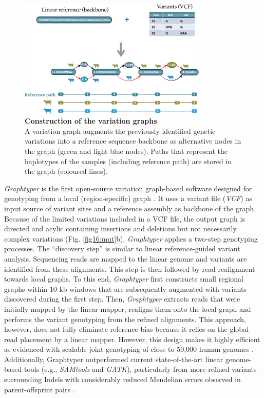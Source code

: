 \documentclass[../main.tex]{subfiles}
\begin{document}
\begin{figure}[!htb]
    \centering
    \includegraphics[width=0.8\textwidth]{intro/fig5.pdf}
        \vspace{3mm}
        \caption[Construction of the variation graphs]{\textbf{Construction of the variation graphs} \\
        \footnotesize{A variation graph augments the previously identified genetic variations into a reference sequence backbone as alternative nodes in the graph (green and light blue nodes). Paths that represent the haplotypes of the samples (including reference path) are stored in the graph (coloured lines).}}
        \label{fig15:vargr}
\end{figure}


\emph{Graphtyper }is the first open-source variation graph-based software designed for genotyping from a local (region-specific) graph \citep{eggertsson2017graphtyper,eggertsson2019graphtyper2}. It uses a variant file (\emph{VCF}) as input source of variant sites and a reference assembly as backbone of the graph. Because of the limited variations included in a VCF file, the output graph is directed and acylic containing insertions and deletions but not necessarily complex variations (Fig. \ref{fig16:mut}b). \emph{Graphtyper} applies a two-step genotyping processes. The  “discovery step” is similar to linear reference-guided variant analysis. Sequencing reads are mapped to the linear genome and variants are identified from these alignments. This step is then followed by read realignment towards local graphs. To this end, \emph{Graphtyper} first constructs small regional graphs within 10 kb windows that are subsequently augmented with variants discovered during the first step. Then, \emph{Graphtyper} extracts reads that were initially mapped by the linear mapper, realigns them onto the local graph and performs the variant genotyping from the refined alignments. This approach, however, does not  fully  eliminate reference bias because it relies on the global read placement by a linear mapper. However, this design makes it highly efficient as evidenced with scalable joint genotyping of close to 50,000 human genomes \citep{eggertsson2019graphtyper2}. Additionally, Graphtyper outperformed current state-of-the-art linear genome-based tools (e.g., \emph{SAMtools} and \emph{GATK}), particularly from more refined variants surrounding Indels with considerably reduced Mendelian errors observed in parent-offsprint pairs \citep{eggertsson2017graphtyper}.
\end{document}
